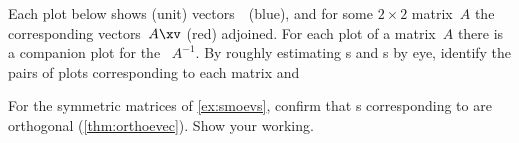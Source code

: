 \begin{exercise}  
Each plot below shows (unit) vectors~\xv\ (blue), and for some \(2\times 2\) matrix~\(A\) the corresponding vectors~\(A\xv\) (red) adjoined. 
For each plot of a matrix~\(A\) there is a companion plot for the ~\(A^{-1}\).
By roughly estimating s and s by eye, identify the pairs of plots corresponding to each matrix and 
\begin{Parts}
\item\label{ex:epria} 
\item\label{ex:eprib} 
\item\label{ex:epric} 
\item\label{ex:eprid} 
\begin{OmitV1}
\item\label{ex:eprie} 
\item\label{ex:eprif} 
\item\label{ex:eprig} 
\end{OmitV1}
\item\label{ex:eprih} 
\item\label{ex:eprii} 
\begin{OmitV1}
\item\label{ex:eprij} 
\end{OmitV1}
\end{Parts}
\end{exercise}





\begin{exercise}  
For the symmetric matrices of \cref{ex:smoevs}, confirm that s corresponding to  are orthogonal (\cref{thm:orthoevec}).  
Show your working.
\end{exercise}






